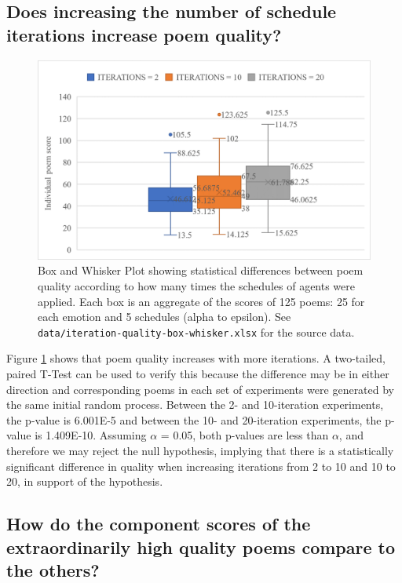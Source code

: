 \documentclass[a4paper,10pt]{article}
\begin{document}
\subsection{Does increasing the number of schedule iterations increase poem quality?}
\label{sec:iteration-quality-box-whisker}

\begin{figure}[htb!]
\centering
\includegraphics[width=1\textwidth]{media/iteration-quality-box-whisker.png}
\caption{Box and Whisker Plot showing statistical differences between poem quality according to how many times the schedules of agents were applied. Each box is an aggregate of the scores of 125 poems: 25 for each emotion and 5 schedules (alpha to epsilon). See \texttt{data/iteration-quality-box-whisker.xlsx} for the source data.}
\label{fig:iteration-quality-box-whisker}
\end{figure}

Figure \ref{fig:iteration-quality-box-whisker} shows that poem quality increases with more iterations. A two-tailed, paired T-Test can be used to verify this because the difference may be in either direction and corresponding poems in each set of experiments were generated by the same initial random process. Between the 2- and 10-iteration experiments, the p-value is 6.001E-5 and between the 10- and 20-iteration experiments, the p-value is 1.409E-10. Assuming $\alpha$ = 0.05, both p-values are less than $\alpha$, and therefore we may reject the null hypothesis, implying that there is a statistically significant difference in quality when increasing iterations from 2 to 10 and 10 to 20, in support of the hypothesis.

\subsection{How do the component scores of the extraordinarily high quality poems compare to the others?}
\end{document}
